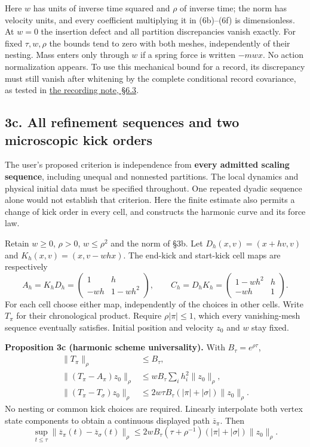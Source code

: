 \documentclass[11pt,a4paper]{article}
\begin{document}
Here \(w\) has units of inverse time squared and \(\rho\) of inverse
time; the norm has velocity units, and every coefficient multiplying it
in (6b)--(6f) is dimensionless. At \(w=0\) the insertion defect and all
partition discrepancies vanish exactly. For fixed \(\tau,w,\rho\) the
bounds tend to zero with both meshes, independently of their nesting.
Mass enters only through \(w\) if a spring force is written \(-mw x\).
No action normalization appears. To use this mechanical bound for a
record, its discrepancy must still vanish after whitening by the
complete conditional record covariance, as tested in
\href{sed-closure-under-recording.md\#complete-record-information-and-adaptive-likelihoods}{the
recording note, §6.3}.

\hypertarget{c.-all-refinement-sequences-and-two-microscopic-kick-orders}{%
\subsection{3c. All refinement sequences and two microscopic kick
orders}\label{c.-all-refinement-sequences-and-two-microscopic-kick-orders}}

The user's proposed criterion is independence from \textbf{every
admitted scaling sequence}, including unequal and nonnested partitions.
The local dynamics and physical initial data must be specified
throughout. One repeated dyadic sequence alone would not establish that
criterion. Here the finite estimate also permits a change of kick order
in every cell, and constructs the harmonic curve and its force law.

Retain \(w\ge0\), \(\rho>0\), \(w\le\rho^2\) and the norm of §3b. Let
\(D_h(x,v)=(x+hv,v)\) and \(K_h(x,v)=(x,v-whx)\). The end-kick and
start-kick cell maps are respectively
\[A_h=K_hD_h=\begin{pmatrix}1&h\\-wh&1-wh^2\end{pmatrix},
\qquad C_h=D_hK_h=\begin{pmatrix}1-wh^2&h\\-wh&1\end{pmatrix}.
\tag{6i}\] For each cell choose either map, independently of the choices
in other cells. Write \(T_\pi\) for their chronological product. Require
\(\rho|\pi|\le1\), which every vanishing-mesh sequence eventually
satisfies. Initial position and velocity \(z_0\) and \(w\) stay fixed.

\textbf{Proposition 3c (harmonic scheme universality).} With
\(B_\tau=e^{\rho\tau}\), \[\begin{aligned}
\|T_\pi\|_\rho&\le B_\tau,\\
\|(T_\pi-A_\pi)z_0\|_\rho
 &\le wB_\tau\sum_i h_i^2\|z_0\|_\rho,\\
\|(T_\pi-T_\sigma)z_0\|_\rho
 &\le2w\tau B_\tau(|\pi|+|\sigma|)\|z_0\|_\rho.
\end{aligned}\tag{6j}\] No nesting or common kick choices are required.
Linearly interpolate both vertex state components to obtain a continuous
displayed path \(\overline z_\pi\). Then
\[\sup_{t\le\tau}\|\overline z_\pi(t)-\overline z_\sigma(t)\|_\rho
\le2wB_\tau(\tau+\rho^{-1})(|\pi|+|\sigma|)\|z_0\|_\rho.
\tag{6k}\]
\end{document}
